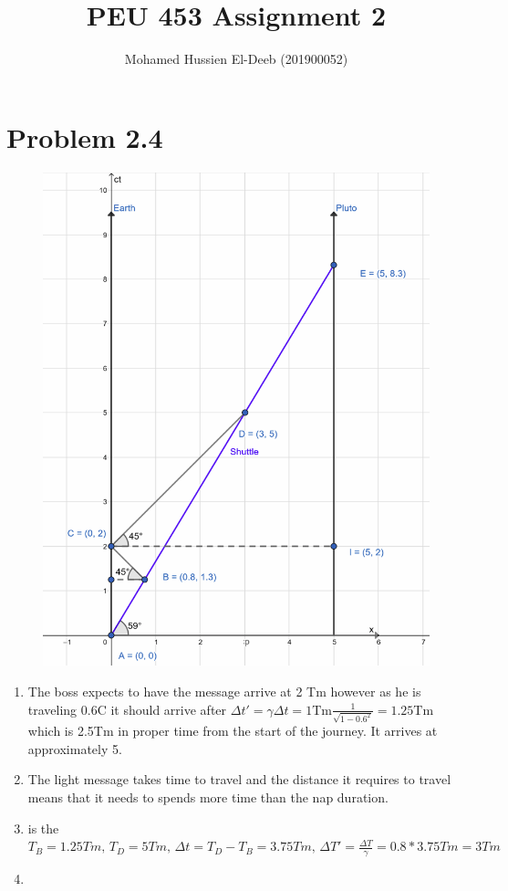 \documentclass[12pt]{article}
\title{PEU 453 Assignment 2}
\author{Mohamed Hussien El-Deeb (201900052)}
\date{}
\begin{document}
\maketitle
\tableofcontents

\section{Problem 2.4}

\begin{figure}[H]
    \centering
    \includegraphics[scale=0.4]{Q1A.png}
\end{figure}

\renewcommand{\labelenumi}{\alph{enumi}.}
\begin{enumerate}
    \item The boss expects to have the message arrive at 2 Tm however as he is traveling 0.6C it should arrive after \(\Delta t'= \gamma \Delta t = 1\text{Tm} \frac{1}{\sqrt{1-0.6^2}} = 1.25\text{Tm} \) which is 2.5Tm in proper time from the start of the journey. It arrives at approximately 5.
    \item The light message takes time to travel and the distance it requires to travel means that it needs to spends more time than the nap duration.
    \item is the \(T_B = 1.25Tm,\, T_D = 5Tm,\, \Delta t = T_D - T_B = 3.75Tm,\, \Delta T' = \frac{\Delta T}{\gamma} = 0.8 * 3.75Tm = 3Tm \)
    \item
\end{enumerate}
\end{document}
